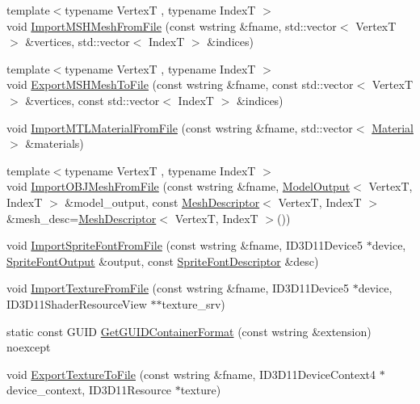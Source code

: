 \begin{DoxyCompactItemize}
\item 
{\footnotesize template$<$typename VertexT , typename IndexT $>$ }\\void \hyperlink{namespacemage_1_1loader_aae8c7494fd3d5d302580c76ba671d280}{Import\+M\+S\+H\+Mesh\+From\+File} (const wstring \&fname, std\+::vector$<$ VertexT $>$ \&vertices, std\+::vector$<$ IndexT $>$ \&indices)
\item 
{\footnotesize template$<$typename VertexT , typename IndexT $>$ }\\void \hyperlink{namespacemage_1_1loader_a86024ac5eb56cab02004527c9bc3a936}{Export\+M\+S\+H\+Mesh\+To\+File} (const wstring \&fname, const std\+::vector$<$ VertexT $>$ \&vertices, const std\+::vector$<$ IndexT $>$ \&indices)
\item 
void \hyperlink{namespacemage_1_1loader_aa93b87b2bbe2d830fabb382da7ecf533}{Import\+M\+T\+L\+Material\+From\+File} (const wstring \&fname, std\+::vector$<$ \hyperlink{classmage_1_1_material}{Material} $>$ \&materials)
\item 
{\footnotesize template$<$typename VertexT , typename IndexT $>$ }\\void \hyperlink{namespacemage_1_1loader_a810ce8ab647023d2133a18ba59df7331}{Import\+O\+B\+J\+Mesh\+From\+File} (const wstring \&fname, \hyperlink{structmage_1_1_model_output}{Model\+Output}$<$ VertexT, IndexT $>$ \&model\+\_\+output, const \hyperlink{classmage_1_1_mesh_descriptor}{Mesh\+Descriptor}$<$ VertexT, IndexT $>$ \&mesh\+\_\+desc=\hyperlink{classmage_1_1_mesh_descriptor}{Mesh\+Descriptor}$<$ VertexT, IndexT $>$())
\item 
void \hyperlink{namespacemage_1_1loader_a9eb452a366c806c9dcc56e14fd6bfbb4}{Import\+Sprite\+Font\+From\+File} (const wstring \&fname, I\+D3\+D11\+Device5 $\ast$device, \hyperlink{structmage_1_1_sprite_font_output}{Sprite\+Font\+Output} \&output, const \hyperlink{classmage_1_1_sprite_font_descriptor}{Sprite\+Font\+Descriptor} \&desc)
\item 
void \hyperlink{namespacemage_1_1loader_a1bf2bc7c0f23f8ad5fb3bba962e456a2}{Import\+Texture\+From\+File} (const wstring \&fname, I\+D3\+D11\+Device5 $\ast$device, I\+D3\+D11\+Shader\+Resource\+View $\ast$$\ast$texture\+\_\+srv)
\item 
static const G\+U\+ID \hyperlink{namespacemage_1_1loader_a2091dc17f88e76e01203509e2607461a}{Get\+G\+U\+I\+D\+Container\+Format} (const wstring \&extension) noexcept
\item 
void \hyperlink{namespacemage_1_1loader_ae6ef9e073e4db5aac8d5cb4a9c354969}{Export\+Texture\+To\+File} (const wstring \&fname, I\+D3\+D11\+Device\+Context4 $\ast$device\+\_\+context, I\+D3\+D11\+Resource $\ast$texture)
$$
\end{DoxyCompactItemize}
